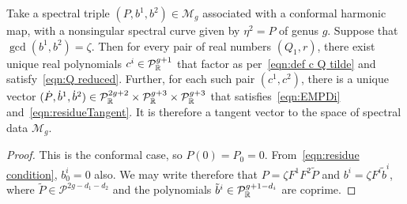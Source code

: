 \documentclass{article}
\begin{document}
\begin{lem}[Case (e)]\label{lem:tangent conformal}
Take a spectral triple $(P,b^1,b^2)\in\mathcal{M}_g$ associated with a conformal harmonic map, with a nonsingular spectral curve given by $\eta^2 = P$ of genus $g$. 
Suppose that $\gcd(b^1,b^2) = \zeta$. 
Then for every pair of real numbers $(Q_1,r)$, there exist unique real polynomials $c^i\in\mathcal{P}^{g+1}_{\mathbb{R}}$ that factor as per~\eqref{eqn:def c Q tilde} and satisfy~\eqref{eqn:Q reduced}. Further, for each such pair $(c^1,c^2)$, there is a unique vector $(\dot P, \dot b^1, \dot b^2) \in \mathcal{P}_{\mathbb{R}}^{2g+2}\times\mathcal{P}_{\mathbb{R}}^{g+3}\times\mathcal{P}_{\mathbb{R}}^{g+3}$ that satisfies~\eqref{eqn:EMPDi} and~\eqref{eqn:residueTangent}. It is therefore a tangent vector to the space of spectral data $\mathcal{M}_g$.

\begin{proof}
This is the conformal case, so $P(0) = P_0 = 0$. From~\eqref{eqn:residue condition}, $b^i_0 = 0$ also. We may write therefore that $P= \zeta F^1F^2\tilde{P}$ and $b^i = \zeta F^i \tilde{b}^i$, where $\tilde{P}\in\mathcal{P}^{2g-d_1-d_2}$ and the polynomials $\tilde{b}^i\in\mathcal{P}^{g+1-d_i}_{\mathbb{R}}$ are coprime.


\end{proof}
\end{lem}
\end{document}
